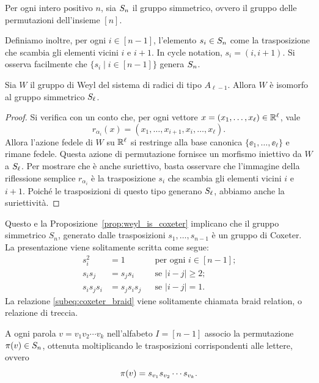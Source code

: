 Per ogni intero positivo $n$, sia $S_n$ il gruppo simmetrico,
ovvero il gruppo delle permutazioni dell'insieme $[n]$.

Definiamo inoltre, per ogni $i \in [n-1]$, l'elemento $s_i \in S_n$ come
la trasposizione che scambia gli elementi vicini $i$ e $i+1$.
In cycle notation, $s_i = (i, i+1)$.
Si osserva facilmente che $\{s_i \mid i \in [n-1] \}$ genera $S_n$.


\begin{proposition}
    Sia $W$ il gruppo di Weyl del sistema di radici di tipo $A_{\ell-1}$.
    Allora $W$ \`e isomorfo al gruppo simmetrico $S_\ell$.
\end{proposition}

\begin{proof}
    Si verifica con un conto che,
    per ogni vettore $x = (x_1, \dots, x_\ell) \in \mathbb{R}^\ell$, vale
    \[
        r_{\alpha_i}(x) = (x_1, \dots, x_{i+1}, x_{i}, \dots, x_\ell).
    \]
    Allora l'azione fedele di $W$ su $\mathbb{R}^\ell$ si restringe alla base
    canonica $\{\ee_1, \dots, \ee_\ell\}$  e rimane fedele.
    Questa azione di permutazione fornisce un morfismo iniettivo da $W$ a $S_\ell$.
    Per mostrare che \`e anche suriettivo, basta osservare che l'immagine della
    riflessione semplice $r_{\alpha_i}$ \`e la trasposizione $s_i$ che scambia gli
    elementi vicini $i$ e $i+1$.
    Poich\'e le trasposizioni di questo tipo generano $S_\ell$, abbiamo anche
    la suriettivit\`a.
\end{proof}

Questo e la Proposizione~\ref{prop:weyl_is_coxeter} implicano che il gruppo simmetrico 
$S_n$, generato dalle trasposizioni $s_1, \dots, s_{n-1}$ \`e un gruppo di Coxeter.
La presentazione viene solitamente scritta come segue:
\begin{subequations}
    \label{eq:coxeter_Sn_presentation}
    \begin{align}
        s_i^2 &= 1  && \text{per ogni $i\in [n-1]$;} \\
        s_i s_j &= s_j s_i && \text{se $\lvert i - j \rvert \geq 2$;} \\
        \label{subeq:coxeter_braid}
        s_i s_j s_i &= s_j s_i s_j && \text{se $\lvert i - j \rvert = 1$.}
    \end{align}
\end{subequations}
La relazione \eqref{subeq:coxeter_braid} viene solitamente chiamata braid relation,
o relazione di treccia.

A ogni parola $v = v_1 v_2 \cdots v_k$ nell'alfabeto $I = [n-1]$ associo la permutazione
$\operatorname{\pi}(v) \in S_n$, ottenuta moltiplicando le trasposizioni corrispondenti alle lettere,
ovvero
\[
    \operatorname{\pi}(v) = s_{v_1} s_{v_2} \cdots s_{v_k}.
\]

